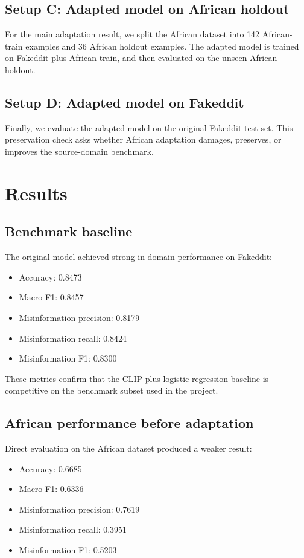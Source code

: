 \documentclass[a4paper,10.5pt,twoside]{article}
\begin{document}
\subsection{Setup C: Adapted model on African holdout}
For the main adaptation result, we split the African dataset into 142 African-train examples and 36 African holdout examples. The adapted model is trained on Fakeddit plus African-train, and then evaluated on the unseen African holdout.

\subsection{Setup D: Adapted model on Fakeddit}
Finally, we evaluate the adapted model on the original Fakeddit test set. This preservation check asks whether African adaptation damages, preserves, or improves the source-domain benchmark.

\section{Results}
\subsection{Benchmark baseline}
The original model achieved strong in-domain performance on Fakeddit:
\begin{itemize}[leftmargin=1.5em]
    \item Accuracy: 0.8473
    \item Macro F1: 0.8457
    \item Misinformation precision: 0.8179
    \item Misinformation recall: 0.8424
    \item Misinformation F1: 0.8300
\end{itemize}

These metrics confirm that the CLIP-plus-logistic-regression baseline is competitive on the benchmark subset used in the project.

\subsection{African performance before adaptation}
Direct evaluation on the African dataset produced a weaker result:
\begin{itemize}[leftmargin=1.5em]
    \item Accuracy: 0.6685
    \item Macro F1: 0.6336
    \item Misinformation precision: 0.7619
    \item Misinformation recall: 0.3951
    \item Misinformation F1: 0.5203
\end{itemize}
\end{document}

